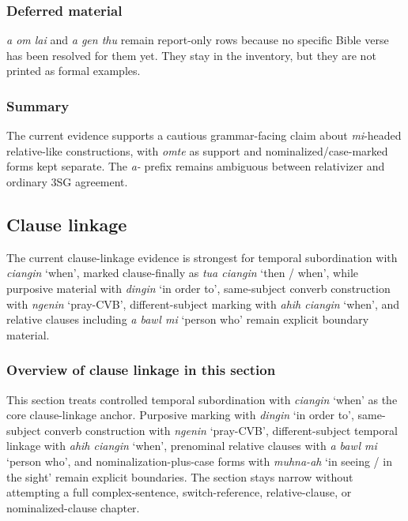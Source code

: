 \documentclass[
  11pt,
  a4paper,
]{article}
\newcommand{\tdim}[1]{\textit{#1}}
\newcommand{\glossquote}[1]{`#1'}
\begin{document}
\subsubsection{Deferred material}\label{deferred-material-7}

\tdim{a om lai} and \tdim{a gen thu} remain report-only rows because no
specific Bible verse has been resolved for them yet. They stay in the
inventory, but they are not printed as formal examples.

\subsubsection{Summary}\label{summary-10}

The current evidence supports a cautious grammar-facing claim about
\tdim{mi}-headed relative-like constructions, with \tdim{omte} as
support and nominalized/case-marked forms kept separate. The \tdim{a-}
prefix remains ambiguous between relativizer and ordinary 3SG agreement.

\subsection{Clause linkage}\label{clause-linkage}

The current clause-linkage evidence is strongest for temporal
subordination with \tdim{ciangin} \glossquote{when}, marked
clause-finally as \tdim{tua ciangin} \glossquote{then / when}, while
purposive material with \tdim{dingin} \glossquote{in order to},
same-subject converb construction with \tdim{ngenin}
\glossquote{pray-CVB}, different-subject marking with
\tdim{ahih ciangin} \glossquote{when}, and relative clauses including
\tdim{a bawl mi} \glossquote{person who} remain explicit boundary
material.

\subsubsection{Overview of clause linkage in this
section}\label{overview-of-clause-linkage-in-this-section}

This section treats controlled temporal subordination with
\tdim{ciangin} \glossquote{when} as the core clause-linkage anchor.
Purposive marking with \tdim{dingin} \glossquote{in order to},
same-subject converb construction with \tdim{ngenin}
\glossquote{pray-CVB}, different-subject temporal linkage with
\tdim{ahih ciangin} \glossquote{when}, prenominal relative clauses with
\tdim{a bawl mi} \glossquote{person who}, and nominalization-plus-case
forms with \tdim{muhna-ah} \glossquote{in seeing / in the sight} remain
explicit boundaries. The section stays narrow without attempting a full
complex-sentence, switch-reference, relative-clause, or
nominalized-clause chapter.
\end{document}

